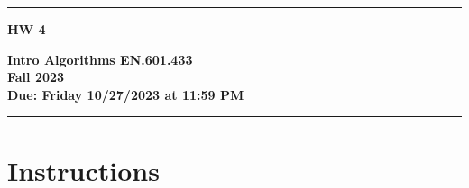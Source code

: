 \documentclass[letter,11pt]{article}
\begin{document}
\noindent\rule[2mm]{\textwidth}{1.5mm}
\noindent
\begin{minipage}{.3\textwidth}
  \vspace{-3mm}
  {\Huge\bf HW 4}
\end{minipage}\hfill\begin{minipage}{.5\textwidth}
\begin{flushright}
  {\bf Intro Algorithms EN.601.433 \\
  Fall 2023 \\
  Due: Friday 10/27/2023 at 11:59 PM}%
\vspace{3mm}
\end{flushright}
\end{minipage}
\noindent\rule{\textwidth}{1.5mm}

\section*{Instructions}
\end{document}

